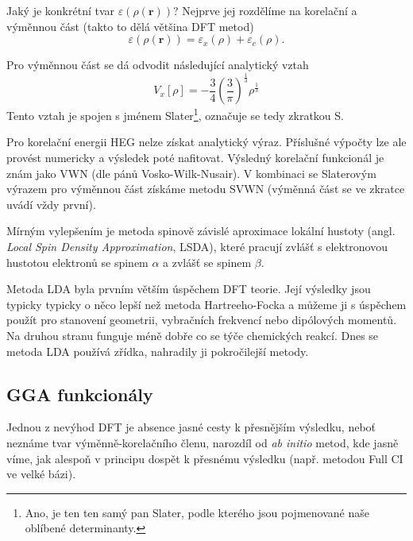 Jaký je konkrétní tvar $\varepsilon(\rho(\textbf{r}))$? Nejprve jej rozdělíme na korelační a výměnnou část (takto to dělá většina DFT metod)
\begin{equation}
\varepsilon(\rho(\textbf{r}))=\varepsilon_x(\rho)+\varepsilon_c(\rho) .
\end{equation}

\noindent Pro výměnnou část se dá odvodit následující analytický vztah
\begin{equation}
V_x[\rho]=-\frac{3}{4}\left(\frac{3}{\pi}\right)^{\frac{1}{3}}\rho^{\frac{1}{3}}
\end{equation}
Tento vztah je spojen s jménem Slater\footnote{Ano, je ten ten samý pan Slater, podle kterého jsou pojmenované naše oblíbené determinanty.}, označuje se tedy zkratkou S.

Pro korelační energii HEG nelze získat analytický výraz. Příslušné výpočty lze ale provést numericky a výsledek poté nafitovat. Výsledný korelační funkcionál je znám jako VWN (dle pánů Vosko-Wilk-Nusair). V kombinaci se Slaterovým výrazem pro výměnnou část získáme metodu SVWN (výměnná část se ve zkratce uvádí vždy první).

Mírným vylepšením je metoda spinově závislé aproximace lokální hustoty (angl. \textit{Local Spin Density Approximation}, LSDA), které pracují zvlášť s elektronovou hustotou elektronů se spinem $\alpha$ a zvlášť se spinem $\beta$.

Metoda LDA byla prvním větším úspěchem DFT teorie. Její výsledky jsou typicky typicky o něco lepší než metoda Hartreeho-Focka a můžeme ji s úspěchem použít pro stanovení geometrii, vybračních frekvencí nebo dipólových momentů. Na druhou stranu funguje méně dobře co se týče chemických reakcí. Dnes se metoda LDA používá zřídka, nahradily ji pokročilejší metody.

\subsection{GGA funkcionály}
Jednou z nevýhod DFT je absence jasné cesty k přesnějším výsledku, neboť neznáme tvar výměnně-korelačního členu, narozdíl od \textit{ab initio} metod, kde jasně víme, jak alespoň v principu dospět k přesnému výsledku (např. metodou Full CI ve velké bázi).

